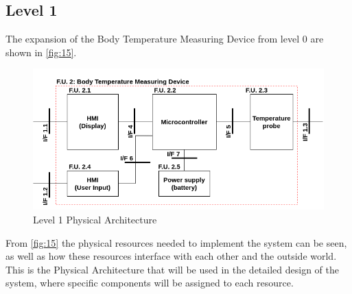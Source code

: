\subsection{Level 1}
The expansion of the Body Temperature Measuring Device from level 0 are shown in \autoref{fig:15}.
\begin{figure}[H]
	\centering
	\includegraphics[scale=0.5]{img/L1PA}
	\caption{Level 1 Physical Architecture}
	\label{fig:15}
\end{figure}
\noindent
From \autoref{fig:15} the physical resources needed to implement the system can be seen, as well as how these resources interface with each other and the outside world.
This is the Physical Architecture that will be used in the detailed design of the system, where specific components will be assigned to each resource. 

